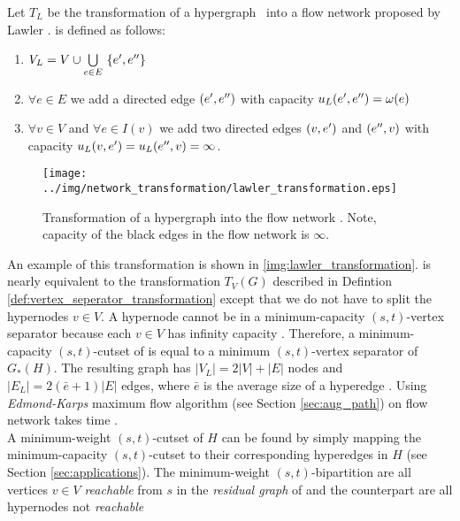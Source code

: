 \begin{definition}
Let $T_L$ be the transformation of a hypergraph \HypergraphDef~into 
a flow network  proposed by Lawler \cite{lawler1973}.  is defined as follows:
\begin{enumerate}
\item $V_L = V \cup \bigcup\limits_{e \in E}\ \{\incoming{e}, \outgoing{e}\}$
\item $\forall e \in E$ we add a directed edge $(e',e'')$ 
      with capacity $u_L(e',e'') = \omega(e)$
\item $\forall v \in V$ and $\forall e \in I(v)$ we add two directed edges $(v, e')$ and 
      $(e'', v)$ with capacity $u_L(v, e') = u_L(e'',v) = \infty$.
\end{enumerate} 
\end{definition}
\begin{figure}
\centering
\texttt{[image: ../img/network\_transformation/lawler\_transformation.eps]}
\caption{Transformation of a hypergraph into the flow network  \cite{lawler1973}. Note,
capacity of the black edges in the flow network is $\infty$.}
\label{img:lawler_transformation}
\end{figure}
An example of this transformation is shown in \autoref{img:lawler_transformation}.
 is nearly equivalent to the transformation $T_V(G)$ described in Defintion \autoref{def:vertex_seperator_transformation}
except that we do not have to split the hypernodes $v \in V$.
A hypernode cannot be in a minimum-capacity $(s,t)$-vertex separator because each $v \in V$ has
infinity capacity \cite{HuMoerder85}. Therefore, a minimum-capacity $(s,t)$-cutset 
of  is equal to a minimum $(s,t)$-vertex separator of $G_*(H)$.
The resulting graph  has $|V_L| = 2|V| + |E|$ nodes and $|E_L| = 2(\bar{e}+1)|E|$ edges, where
$\bar{e}$ is the average size of a hyperedge \cite{pistorius2003}. Using \emph{Edmond-Karps}
maximum flow algorithm (see Section \ref{sec:aug_path}) on flow network  
takes time  \cite{lawler1973}. \\
A minimum-weight $(s,t)$-cutset of $H$ can be found by simply mapping the minimum-capacity
$(s,t)$-cutset to their corresponding hyperedges in $H$ (see Section \ref{sec:applications}). 
The minimum-weight $(s,t)$-bipartition are all vertices $v \in V$ \emph{reachable} from $s$ in the 
\emph{residual graph} of  and the counterpart are all hypernodes not \emph{reachable}
